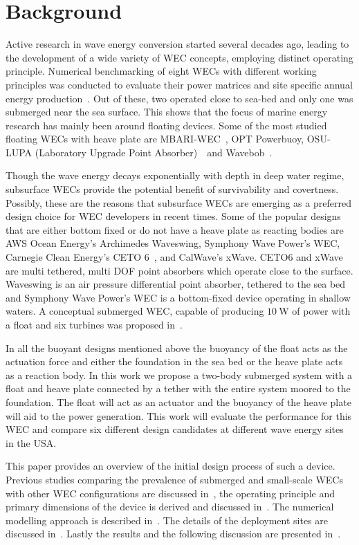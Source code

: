 \documentclass[10pt,journal,a4paper,twoside]{./IMEJ}
\begin{document}
\section{Background}
\label{sec:background}
Active research in wave energy conversion started several decades ago, leading to the development of a wide variety of WEC concepts, employing distinct operating principle. Numerical benchmarking of eight WECs with different working principles was conducted to evaluate their power matrices and site specific annual energy production~\cite{babarit2012}. Out of these, two operated close to sea-bed and only one was submerged near the sea surface. This shows that the focus of marine energy research has mainly been around floating devices. Some of the most studied floating WECs with heave plate are MBARI-WEC~\cite{hamiltonMBARIWECPowerSource2021}, OPT Powerbuoy, OSU-LUPA (Laboratory Upgrade Point Absorber)~\cite{beringer_numerical_2026}~and Wavebob~\cite{beatty_wave_2019}. 
\par
Though the wave energy decays exponentially with depth in deep water regime, subsurface WECs provide the potential benefit of survivability and covertness. Possibly, these are the reasons that subsurface WECs are emerging as a preferred design choice for WEC developers in recent times. Some of the popular designs that are either bottom fixed or do not have a heave plate as reacting bodies are AWS Ocean Energy’s Archimedes Waveswing, Symphony Wave Power’s WEC, Carnegie Clean Energy’s CETO 6~\cite{sergiienkoOptimalArrangementMooring2016}, and CalWave’s xWave. CETO6 and xWave are multi tethered, multi DOF point absorbers which operate close to the surface. Waveswing is an air pressure differential point absorber, tethered to the sea bed and Symphony Wave Power’s WEC is a bottom-fixed device operating in shallow waters.
A conceptual submerged WEC, capable of producing $10~\mathrm{W}$ of power with a float and six turbines was proposed in~\cite{jmse12010137}.
\par In all the buoyant designs mentioned above the buoyancy of the float acts as the actuation force and either the foundation in the sea bed or the heave plate acts as a reaction body. In this work we propose a two-body submerged system with a float and heave plate connected by a tether with the entire system moored to the foundation. The float will act as an actuator and the buoyancy of the heave plate will aid to the power generation. This work will evaluate the performance for this WEC and compare six different design candidates at different wave energy sites in the USA. 
\par
This paper provides an overview of the initial design process of such a device. Previous studies comparing the prevalence of submerged and small-scale WECs with other WEC configurations are discussed in~, the operating principle and primary dimensions of the device is derived and discussed in~. The numerical modelling approach is described in~. The details of the deployment sites are discussed in~. Lastly the results and the following discussion are presented in~.
\end{document}
